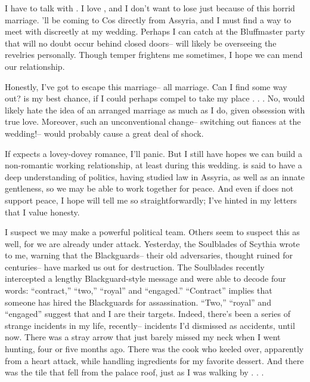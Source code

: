\documentclass[char]{Kos}
\begin{document}
I have to talk with \cPoet{}. I love \cPoet{\them}, and I don't want to lose \cPoet{\them} just because of this horrid marriage. \cPoet{\They}'ll be coming to Cos directly from Assyria, and I must find a way to meet with \cPoet{\them} discreetly at my wedding. Perhaps I can catch \cPoet{\them} at the Bluffmaster party that will no doubt occur behind closed doors-- \cPoet{} will likely be overseeing the revelries personally. Though \cPoet{\their} temper frightens me sometimes, I hope we can mend our relationship.

Honestly, I've got to escape this marriage-- all marriage. Can I find some way out? \cPoet{} is my best chance, if I could perhaps compel \cPoet{} to take my place . . . No, \cPoet{\they} would likely hate the idea of an arranged marriage as much as I do, given \cPoet{\their} obsession with true love. Moreover, such an unconventional change-- switching out fiances at the wedding!-- would probably cause a great deal of shock.

 If \cBride{\they} expects a lovey-dovey romance, I'll panic. But I still have hopes we can build a non-romantic working relationship, at least during this wedding. \cBride{\They} is said to have a deep understanding of politics, having studied law in Assyria, as well as an innate gentleness, so we may be able to work together for peace. And even if \cBride{\they} does not support peace, I hope \cBride{\they} will tell me so straightforwardly; I've hinted in my letters that I value honesty.
 
I suspect we may make a powerful political team. Others seem to suspect this as well, for we are already under attack. Yesterday, the Soulblades of Scythia wrote to me, warning that the Blackguards-- their old adversaries, thought ruined for centuries-- have marked us out for destruction. The Soulblades recently intercepted a lengthy Blackguard-style message and were able to decode four words: ``contract,'' ``two,'' ``royal'' and ``engaged.'' ``Contract'' implies that someone has hired the Blackguards for assassination. ``Two,'' ``royal'' and ``engaged'' suggest that \cBride{\they} and I are their targets. Indeed, there's been a series of strange incidents in my life, recently-- incidents I'd dismissed as accidents, until now. There was a stray arrow that just barely missed my neck when I went hunting, four or five months ago. There was the cook who keeled over, apparently from a heart attack, while handling ingredients for my favorite dessert. And there was the tile that fell from the palace roof, just as I was walking by . . . 
\end{document}
